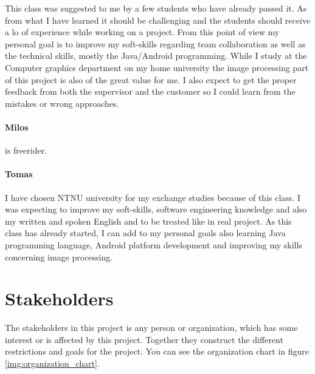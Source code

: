 This class was suggested to me by a few students who have already passed it. As from what I have learned it should be challenging and the students should receive a lo of experience while working on a project. From this point of view my personal goal is to improve my soft-skills regarding team collaboration as well as the technical skills, mostly the Java/Android programming. While I study at the Computer graphics department on my home university the image processing part of this project is also of the great value for me. I also expect to get the proper feedback from both the supervisor and the customer so I could learn from the mistakes or wrong approaches.

\paragraph{Milos}

is freerider.

\paragraph{Tomas}
I have chosen NTNU university for my exchange studies because of this class. 
I was expecting to improve my soft-skills, software engineering knowledge and also my written and spoken English and to be treated like in real project.
As this class has already started, I can add to my personal goals also learning Java programming language,
Android platform development and improving my skills concerning image processing.

\section{Stakeholders}

The stakeholders in this project is any person or organization, which has some interest or is affected by this project. Together they construct the different restrictions and goals for the project. 
You can see the organization chart in figure \ref{img:organization_chart}.

